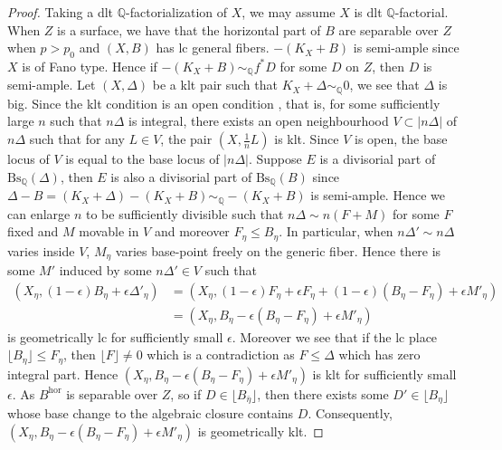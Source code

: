 \documentclass[letterpaper,reqno,12pt]{amsart}
\numberwithin{equation}{section}
\theoremstyle{plain}
\begin{document}
\begin{proof}
    Taking a dlt ${\mathbb Q}$-factorialization of $X$, we may assume $X$ is dlt ${\mathbb Q}$-factorial. When $Z$ is a surface, we have that the horizontal part of $B$ are separable over $Z$ when $p>p_0$ and $(X,B)$ has lc general fibers. $-(K_X+B)$ is semi-ample since $X$ is of Fano type. Hence if $-(K_X+B)\sim_{\mathbb Q}f^*D$ for some $D$ on $Z$, then $D$ is semi-ample. Let $(X,\Delta)$ be a klt pair such that $K_X+\Delta\sim_{\mathbb Q}0$, we see that $\Delta$ is big. Since the klt condition is an open condition , that is, for some sufficiently large $n$ such that $n\Delta$ is integral, there exists an open neighbourhood $V\subset |n\Delta|$ of $n\Delta$ such that for any $L\in V$, the pair $(X,\frac{1}{n}L)$ is klt.  Since $V$ is open, the base locus of $V$ is equal to the base locus of $|n\Delta|$. Suppose $E$ is a divisorial part of $\text{Bs}_\mathbb Q(\Delta)$, then $E$ is also a divisorial part of $\text{Bs}_\mathbb Q(B)$ since $\Delta-B=(K_X+\Delta)-(K_X+B)\sim_\mathbb Q-(K_X+B)$ is semi-ample. Hence we can enlarge $n$ to be sufficiently divisible such that $n\Delta\sim n(F+M)$ for some $F$ fixed and $M$ movable in $V$ and moreover $F_\eta\leq B_\eta$. In particular, when $n\Delta'\sim n\Delta$ varies inside $V$, $M_\eta$ varies base-point freely on the generic fiber. Hence there is some $M'$ induced by some $n\Delta'\in V$ such that \[\begin{aligned}(X_\eta,(1-\epsilon)B_\eta+\epsilon \Delta'_\eta)&=(X_\eta, (1-\epsilon)F_\eta+\epsilon F_\eta+(1-\epsilon)(B_\eta-F_\eta)+\epsilon M'_\eta)\\&=(X_\eta,B_\eta-\epsilon(B_\eta-F_\eta)+\epsilon M'_\eta)\end{aligned}\] is geometrically lc for sufficiently small $\epsilon$. Moreover we see that if the lc place $\lfloor B_\eta\rfloor\leq F_\eta$, then $\lfloor F\rfloor\neq 0$ which is a contradiction as $F\leq \Delta$ which has zero integral part. Hence $(X_\eta,B_\eta-\epsilon(B_\eta-F_\eta)+\epsilon M'_\eta)$ is klt for sufficiently small $\epsilon$. As $B^{\text{hor}}$ is separable over $Z$, so if $D\in \lfloor B_{\bar\eta}\rfloor$, then there exists some $D'\in \lfloor B_{\eta}\rfloor$ whose base change to the algebraic closure contains $D$. Consequently, $(X_\eta,B_\eta-\epsilon(B_\eta-F_\eta)+\epsilon M'_\eta)$ is geometrically klt.


\end{proof}
\end{document}
